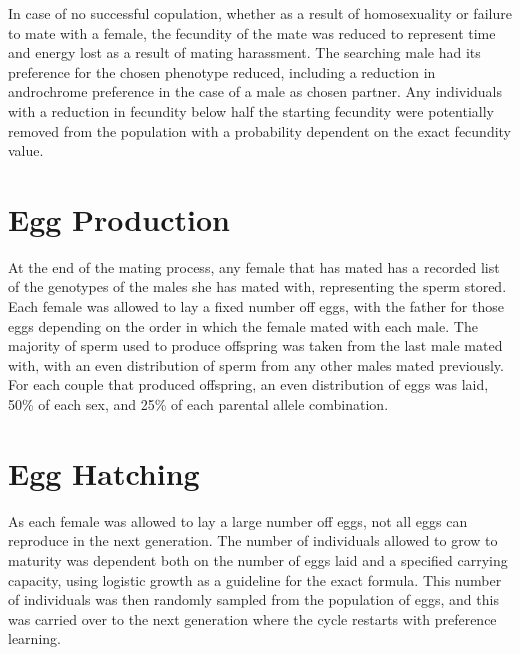 \documentclass{article}
\begin{document}
In case of no successful copulation, whether as a result of homosexuality or failure to mate with a female, the fecundity of the mate was reduced to represent time and energy lost as a result of mating harassment. The searching male had its preference for the chosen phenotype reduced, including a reduction in androchrome preference in the case of a male as chosen partner. Any individuals with a reduction in fecundity below half the starting fecundity were potentially removed from the population with a probability dependent on the exact fecundity value.

\section{Egg Production}
At the end of the mating process, any female that has mated has a recorded list of the genotypes of the males she has mated with, representing the sperm stored. Each female was allowed to lay a fixed number off eggs, with the father for those eggs depending on the order in which the female mated with each male. The majority of sperm used to produce offspring was taken from the last male mated with, with an even distribution of sperm from any other males mated previously. For each couple that produced offspring, an even distribution of eggs was laid, 50\% of each sex, and 25\% of each parental allele combination.

\section{Egg Hatching}
As each female was allowed to lay a large number off eggs, not all eggs can reproduce in the next generation. The number of individuals allowed to grow to maturity was dependent both on the number of eggs laid and a specified carrying capacity, using logistic growth as a guideline for the exact formula. This number of individuals was then randomly sampled from the population of eggs, and this was carried over to the next generation where the cycle restarts with preference learning. 

\printbibliography
\end{document}
